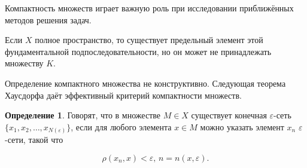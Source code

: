 \documentclass[12pt,a4paper,titlepage,oneside]{book}
\theoremstyle{definition}
\newtheorem*{definition}{Определение}
\theoremstyle{plain}
\theoremstyle{break}
\theoremstyle{remark}
\theoremstyle{remark}
\theoremstyle{remark}
\theoremstyle{remark}
\theoremstyle{plain}
\theoremstyle{plain}
\begin{document}
Компактность множеств играет важную роль при исследовании приближённых методов решения задач.

Если $X$ полное пространство, то существует предельный элемент этой фундаментальной подпоследовательности, но он может не принадлежать множеству $K$.

Определение компактного множества не конструктивно. Следующая теорема Хаусдорфа даёт эффективный критерий компактности множеств.

\begin{definition}
Говорят, что в множестве $M \in X$ существует конечная $\varepsilon$-сеть $\lbrace x_1,x_2,\ldots,x_{N(\varepsilon)} \rbrace$, если для любого элемента $x \in M$ можно указать элемент $x_n$ $\varepsilon$-сети, такой что

$$
\rho(x_n, x) < \varepsilon \mbox{, } n=n(x,\varepsilon).
$$

\end{definition}
\end{document}
